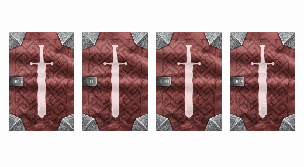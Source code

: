 \documentclass{minimal}
\begin{document}
{\begin{longtable}{llll}
\includegraphics[width=44mm,height=68mm]{./15-21/gh-015-boots-of-speed-back.png} &
\includegraphics[width=44mm,height=68mm]{./15-21/gh-015-boots-of-speed-back.png} &
\includegraphics[width=44mm,height=68mm]{./1-14/gh-014-minor-power-potion-back.png} &
\includegraphics[width=44mm,height=68mm]{./1-14/gh-014-minor-power-potion-back.png}\\ 

\end{longtable}}
\end{document}
